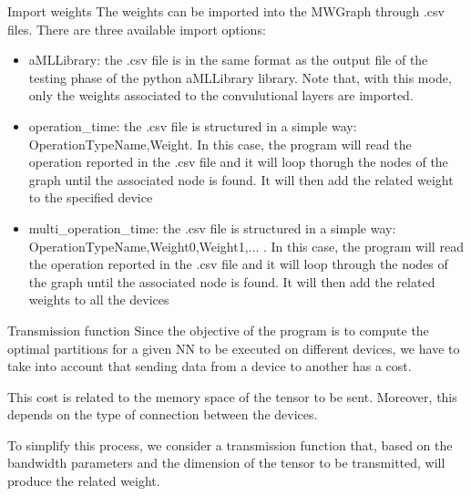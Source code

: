 \begin{frame}{Import weights}
    The weights can be imported into the MWGraph through .csv files. There are three available import options:
    \begin{itemize}
        \item aMLLibrary: the .csv file is in the same format as the output file of the testing phase of the python aMLLibrary library. Note that, with this mode, only the weights associated to the convulutional layers are imported. 
        \item operation\_time: the .csv file is structured in a simple way: OperationTypeName,Weight. In this case, the program will read the operation reported in the .csv file and it will loop thorugh the nodes of the graph until the associated node is found. It will then add the related weight to the specified device
        \item multi\_operation\_time: the .csv file is structured in a simple way: OperationTypeName,Weight0,Weight1,... . In this case, the program will read the operation reported in the .csv file and it will loop through the nodes of the graph until the associated node is found. It will then add the related weights to all the devices
    \end{itemize}
\end{frame}

\begin{frame}{Transmission function}
    Since the objective of the program is to compute the optimal partitions for a given NN to be executed on different devices, we have to take into account that sending data from a device to another has a cost. 
    
    This cost is related to the memory space of the tensor to be sent. Moreover, this depends on the type of connection between the devices. 
    
    To simplify this process, we consider a transmission function that, based on the bandwidth parameters and the dimension of the tensor to be transmitted, will produce the related weight.
\end{frame}

